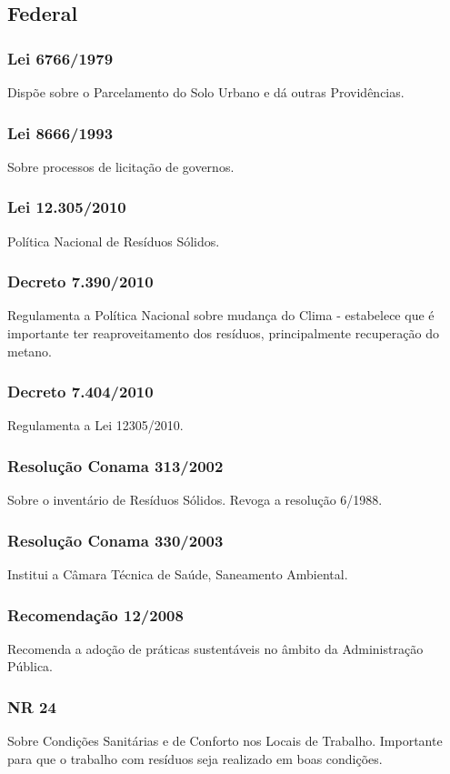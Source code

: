 \begin{subapend}
	\subsection{Federal}
	\begin{subsubapend}
		\item \subsubsection{Lei 6766/1979}
		Dispõe sobre o Parcelamento do Solo Urbano e dá outras Providências.
		\subsubsection{Lei 8666/1993}
		Sobre processos de licitação de governos.
		\subsubsection{Lei 12.305/2010}
		Política Nacional de Resíduos Sólidos.
		\subsubsection{Decreto 7.390/2010}
		Regulamenta a Política Nacional sobre mudança do Clima - estabelece que é importante ter reaproveitamento dos resíduos, principalmente recuperação do metano.
		\subsubsection{Decreto 7.404/2010}
		Regulamenta a Lei 12305/2010.
		\subsubsection{Resolução Conama 313/2002}
		Sobre o inventário de Resíduos Sólidos. Revoga a resolução 6/1988.
		\subsubsection{Resolução Conama 330/2003}
		Institui a Câmara Técnica de Saúde, Saneamento Ambiental.
		\subsubsection{Recomendação 12/2008}
		Recomenda a adoção de práticas sustentáveis no âmbito da Administração Pública.
		\subsubsection{NR 24}
		Sobre Condições Sanitárias e de Conforto nos Locais de Trabalho. Importante para que o trabalho com resíduos seja realizado em boas condições.

\end{subsubapend}
\end{subapend}
